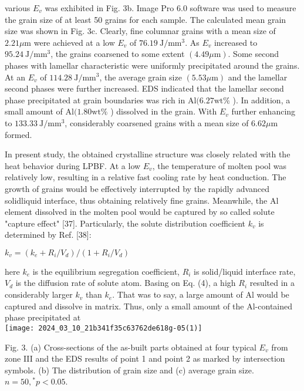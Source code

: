 \documentclass[10pt]{article}
\begin{document}
various $E_{v}$ was exhibited in Fig. 3b. Image Pro 6.0 software was used to measure the grain size of at least 50 grains for each sample. The calculated mean grain size was shown in Fig. 3c. Clearly, fine columnar grains with a mean size of $2.21 \mu \mathrm{m}$ were achieved at a low $E_{v}$ of $76.19 \mathrm{~J} / \mathrm{mm}^{3}$. As $E_{v}$ increased to $95.24 \mathrm{~J} / \mathrm{mm}^{3}$, the grains coarsened to some extent $(4.49 \mu \mathrm{m})$. Some second phases with lamellar characteristic were uniformly precipitated around the grains. At an $E_{v}$ of $114.28 \mathrm{~J} / \mathrm{mm}^{3}$, the average grain size $(5.53 \mu \mathrm{m})$ and the lamellar second phases were further increased. EDS indicated that the lamellar second phase precipitated at grain boundaries was rich in $\mathrm{Al}(6.27 \mathrm{wt} \%$ ). In addition, a small amount of $\mathrm{Al}(1.80 \mathrm{wt} \%$ ) dissolved in the grain. With $E_{v}$ further enhancing to $133.33 \mathrm{~J} / \mathrm{mm}^{3}$, considerably coarsened grains with a mean size of $6.62 \mu \mathrm{m}$ formed.

In present study, the obtained crystalline structure was closely related with the heat behavior during LPBF. At a low $E_{v}$, the temperature of molten pool was relatively low, resulting in a relative fast cooling rate by heat conduction. The growth of grains would be effectively interrupted by the rapidly advanced solidliquid interface, thus obtaining relatively fine grains. Meanwhile, the $\mathrm{Al}$ element dissolved in the molten pool would be captured by so called solute "capture effect" [37]. Particularly, the solute distribution coefficient $k_{v}$ is determined by Ref. [38]:

$k_{v}=\left(k_{e}+R_{i} / V_{d}\right) /\left(1+R_{i} / V_{d}\right)$

here $k_{e}$ is the equilibrium segregation coefficient, $R_{i}$ is solid/liquid interface rate, $V_{d}$ is the diffusion rate of solute atom. Basing on Eq. (4), a high $R_{i}$ resulted in a considerably larger $k_{v}$ than $k_{e}$. That was to say, a large amount of $\mathrm{Al}$ would be captured and dissolve in matrix. Thus, only a small amount of the Al-contained phase precipitated at\\
\texttt{[image: 2024\_03\_10\_21b341f35c63762de618g-05(1)]}

Fig. 3. (a) Cross-sections of the as-built parts obtained at four typical $E_{v}$ from zone III and the EDS results of point 1 and point 2 as marked by intersection symbols. (b) The distribution of grain size and (c) average grain size. $n=50,{ }^{*} p<0.05$.
\end{document}
